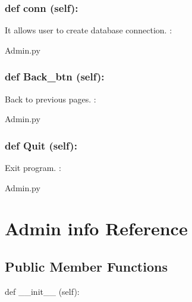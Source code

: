 \hypertarget{class_poly_a14a7ad77ce612b0c54f531d307ee4b39}{
\subsubsection[{def conn(self):}]{\setlength{\rightskip}{0pt plus 5cm}def {conn} (self):}}\label{class_poly_a14a7ad77ce612b0c54f531d307ee4b39}
It allows user to create database connection.
:\begin{DoxyCompactItemize}
\item 
Admin.\-py\end{DoxyCompactItemize}

\hypertarget{class_poly_a14a7ad77ce612b0c54f531d307ee4b39}{
\subsubsection[{def Back_btn(self):}]{\setlength{\rightskip}{0pt plus 5cm}def {Back\_btn} (self):}}\label{class_poly_a14a7ad77ce612b0c54f531d307ee4b39}
Back to previous pages.
:\begin{DoxyCompactItemize}
\item 
Admin.\-py\end{DoxyCompactItemize}

\hypertarget{class_poly_a14a7ad77ce612b0c54f531d307ee4b39}{
\subsubsection[{def Quit(self):}]{\setlength{\rightskip}{0pt plus 5cm}def {Quit} (self):}}\label{class_poly_a14a7ad77ce612b0c54f531d307ee4b39}
Exit program.
:\begin{DoxyCompactItemize}
\item 
Admin.\-py\end{DoxyCompactItemize}


\hypertarget{Admin_info}{\section{Admin info Reference}
\label{Admin_info}
}
\subsection*{Public Member Functions}
\begin{DoxyCompactItemize}
\item 
def {\_\_init\_\_} (self):

\end{DoxyCompactItemize}

